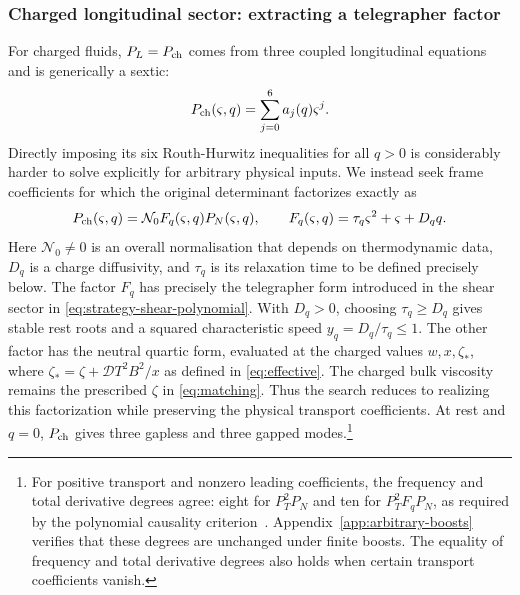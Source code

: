 \subsubsection{Charged longitudinal sector: extracting a telegrapher factor}
For charged fluids, $P_L=P_{\rm ch}$ comes from three coupled
longitudinal equations and is generically a sextic:
\begin{equation}\label{eq:strategy-charged-sextic}
 P_{\rm ch}(\varsigma,q)=\sum_{j=0}^{6}a_j(q)\varsigma^j.
\end{equation}
Directly imposing its six Routh-Hurwitz inequalities for all $q>0$ is
considerably harder to solve explicitly for arbitrary physical inputs. We instead seek frame coefficients for
which the original determinant factorizes exactly as
\begin{equation}\label{eq:strategy-factorization}
 P_{\rm ch}(\varsigma,q)=\mathcal N_0F_q(\varsigma,q)P_N(\varsigma,q),\qquad
 F_q(\varsigma,q)=\tau_q\varsigma^2+\varsigma+D_qq.
\end{equation}
Here $\mathcal N_0\ne0$ is an overall normalisation that depends on thermodynamic data, $D_q$ is
a charge diffusivity, and $\tau_q$ is its relaxation time to be defined precisely below. The factor
$F_q$ has precisely the telegrapher form introduced in the shear
sector in \eqref{eq:strategy-shear-polynomial}. With $D_q>0$, choosing $\tau_q\geq D_q$ gives stable rest
roots and a squared characteristic speed $y_q=D_q/\tau_q\leq1$.
The other factor has the neutral quartic form, evaluated at the charged
values $w,x,\zeta_*$, where
$\zeta_*=\zeta+\mathcal D T^2B^2/x$ as defined in \eqref{eq:effective}.
The charged bulk viscosity remains the prescribed $\zeta$ in
\eqref{eq:matching}. Thus the search reduces to realizing this
factorization while preserving the physical transport coefficients. At rest and $q=0$, $P_{\rm ch}$ gives three gapless and three
gapped modes.\footnote{For positive transport and nonzero leading coefficients, the frequency
and total derivative degrees agree: eight for $P_T^2P_N$ and ten for
$P_T^2F_qP_N$, as required by the polynomial causality
criterion~\cite{HoultKovtunDispersion}. Appendix~\ref{app:arbitrary-boosts}
verifies that these degrees are unchanged under finite boosts.
The equality of frequency and total derivative degrees also holds when
certain transport coefficients vanish.}


